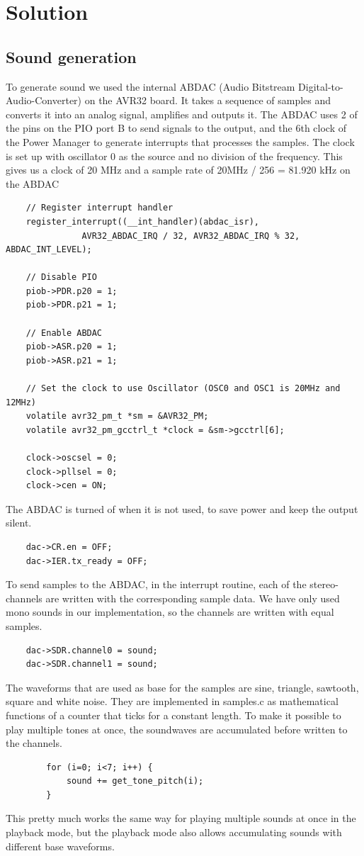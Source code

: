 \section{Solution}
\subsection{Sound generation}
To generate sound we used the internal ABDAC (Audio Bitstream Digital-to-Audio-Converter) on the AVR32 board. It takes a sequence of samples and converts it into an analog signal, amplifies and outputs it.
The ABDAC uses 2 of the pins on the PIO port B to send signals to the output, and the 6th clock of the Power Manager to generate interrupts that processes the samples. The clock is set up with oscillator 0 as the source and no division of the frequency. This gives us a clock of 20 MHz and a sample rate of 20MHz / 256 = 81.920 kHz on the ABDAC\\
\begin{lstlisting}
	// Register interrupt handler
	register_interrupt((__int_handler)(abdac_isr),
			   AVR32_ABDAC_IRQ / 32, AVR32_ABDAC_IRQ % 32, ABDAC_INT_LEVEL);

	// Disable PIO
	piob->PDR.p20 = 1;
	piob->PDR.p21 = 1;

	// Enable ABDAC
	piob->ASR.p20 = 1;
	piob->ASR.p21 = 1;

	// Set the clock to use Oscillator (OSC0 and OSC1 is 20MHz and 12MHz)
	volatile avr32_pm_t *sm = &AVR32_PM;
	volatile avr32_pm_gcctrl_t *clock = &sm->gcctrl[6];

	clock->oscsel = 0;
	clock->pllsel = 0;
	clock->cen = ON;
\end{lstlisting}
The ABDAC is turned of when it is not used, to save power and keep the output silent.\\
\begin{lstlisting}
	dac->CR.en = OFF;
	dac->IER.tx_ready = OFF;
\end{lstlisting}
To send samples to the ABDAC, in the interrupt routine, each of the stereo-channels are written with the corresponding sample data. We have only used mono sounds in our implementation, so the channels are written with equal samples.\\
\begin{lstlisting}
	dac->SDR.channel0 = sound;
	dac->SDR.channel1 = sound;
\end{lstlisting}
The waveforms that are used as base for the samples are sine, triangle, sawtooth, square and white noise. They are implemented in samples.c as mathematical functions of a counter that ticks for a constant length. To make it possible to play multiple tones at once, the soundwaves are accumulated before written to the channels.\\
\begin{lstlisting}
		for (i=0; i<7; i++) {
			sound += get_tone_pitch(i);
		}
\end{lstlisting}
This pretty much works the same way for playing multiple sounds at once in the playback mode, but the playback mode also allows accumulating sounds with different base waveforms.\\

